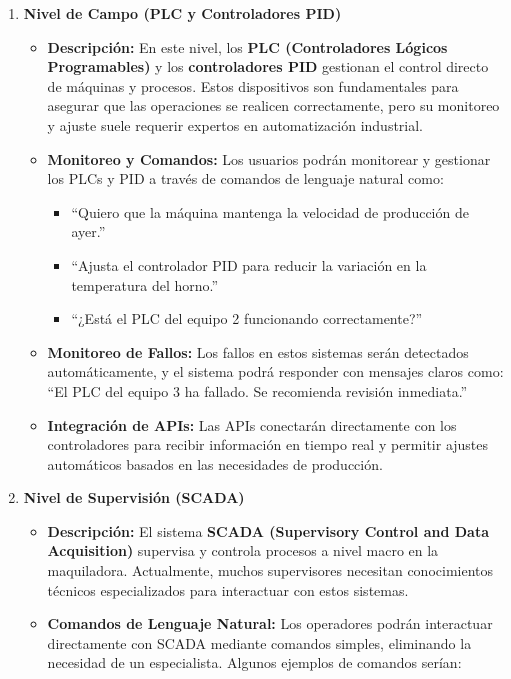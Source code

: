 \documentclass[
  10pt,
  letterpaper,
]{book}
\providecommand{\tightlist}{%
  \setlength{\itemsep}{0pt}\setlength{\parskip}{0pt}}\usepackage{longtable,booktabs,array}
\begin{document}
\begin{enumerate}
\def\labelenumi{\arabic{enumi}.}
\item
  \textbf{Nivel de Campo (PLC y Controladores PID)}

  \begin{itemize}
  \item
    \textbf{Descripción:} En este nivel, los \textbf{PLC (Controladores
    Lógicos Programables)} y los \textbf{controladores PID} gestionan el
    control directo de máquinas y procesos. Estos dispositivos son
    fundamentales para asegurar que las operaciones se realicen
    correctamente, pero su monitoreo y ajuste suele requerir expertos en
    automatización industrial.
  \item
    \textbf{Monitoreo y Comandos:} Los usuarios podrán monitorear y
    gestionar los PLCs y PID a través de comandos de lenguaje natural
    como:

    \begin{itemize}
    \tightlist
    \item
      ``Quiero que la máquina mantenga la velocidad de producción de
      ayer.''
    \item
      ``Ajusta el controlador PID para reducir la variación en la
      temperatura del horno.''
    \item
      ``¿Está el PLC del equipo 2 funcionando correctamente?''
    \end{itemize}
  \item
    \textbf{Monitoreo de Fallos:} Los fallos en estos sistemas serán
    detectados automáticamente, y el sistema podrá responder con
    mensajes claros como: ``El PLC del equipo 3 ha fallado. Se
    recomienda revisión inmediata.''
  \item
    \textbf{Integración de APIs:} Las APIs conectarán directamente con
    los controladores para recibir información en tiempo real y permitir
    ajustes automáticos basados en las necesidades de producción.
  \end{itemize}
\item
  \textbf{Nivel de Supervisión (SCADA)}

  \begin{itemize}
  \item
    \textbf{Descripción:} El sistema \textbf{SCADA (Supervisory Control
    and Data Acquisition)} supervisa y controla procesos a nivel macro
    en la maquiladora. Actualmente, muchos supervisores necesitan
    conocimientos técnicos especializados para interactuar con estos
    sistemas.
  \item
    \textbf{Comandos de Lenguaje Natural:} Los operadores podrán
    interactuar directamente con SCADA mediante comandos simples,
    eliminando la necesidad de un especialista. Algunos ejemplos de
    comandos serían:


\end{itemize}
\end{enumerate}
\end{document}
